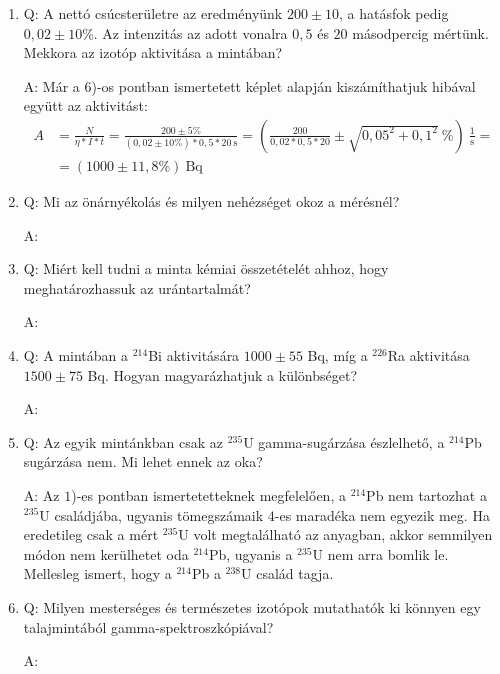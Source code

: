 \begin{enumerate}
    \item Q: A nettó csúcsterületre az eredményünk $200 \pm 10$, a hatásfok pedig $0,02 \pm 10$\%. Az intenzitás az adott vonalra $0,5$ és $20$ másodpercig mértünk. Mekkora az izotóp aktivitása a mintában?
    \begin{displayquote}
        A: Már a $6$)-os pontban ismertetett képlet alapján kiszámíthatjuk hibával együtt az aktivitást:
        \begin{align}
            A
            &=
            \frac{N}{\eta * I * t}
            =
            \frac{200 \pm 5\%}{\left( 0,02 \pm 10\% \right) * 0,5 * 20\ \text{s}}
            =
            \left( \frac{200}{0,02 * 0,5 * 20} \pm \sqrt{0,05^{2} + 0,1^{2}}\ \% \right)\ \frac{1}{\text{s}}
            = \nonumber \\
            &=
            \left( 1000 \pm 11,8\% \right)\ \text{Bq}
        \end{align}
    \end{displayquote}
    
    \item Q: Mi az önárnyékolás és milyen nehézséget okoz a mérésnél?
    \begin{displayquote}
        A: 
    \end{displayquote}
    
    \item Q: Miért kell tudni a minta kémiai összetételét ahhoz, hogy meghatározhassuk az urántartalmát?
    \begin{displayquote}
        A: 
    \end{displayquote}
    
    \item Q: A mintában a $^{214}$Bi aktivitására $1000 \pm 55$ Bq, míg a $^{226}$Ra aktivitása $1500 \pm 75$ Bq. Hogyan magyarázhatjuk a különbséget?
    \begin{displayquote}
        A: 
    \end{displayquote}
    
    \item Q: Az egyik mintánkban csak az $^{235}$U gamma-sugárzása észlelhető, a $^{214}$Pb sugárzása nem. Mi lehet ennek az oka?
    \begin{displayquote}
        A: Az $1$)-es pontban ismertetetteknek megfelelően, a $^{214}$Pb nem tartozhat a $^{235}$U családjába, ugyanis tömegszámaik $4$-es maradéka nem egyezik meg. Ha eredetileg csak a mért $^{235}$U volt megtalálható az anyagban, akkor semmilyen módon nem kerülhetet oda $^{214}$Pb, ugyanis a $^{235}$U nem arra bomlik le. Mellesleg ismert, hogy a $^{214}$Pb a $^{238}$U család tagja.
    \end{displayquote}
    
    \item Q: Milyen mesterséges és természetes izotópok mutathatók ki könnyen egy talajmintából gamma-spektroszkópiával?
    \begin{displayquote}
        A: 
    \end{displayquote}
\end{enumerate}